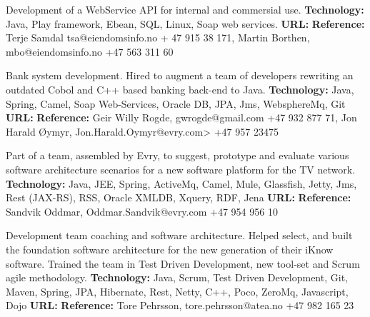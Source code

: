 \documentclass[11pt,a4paper,sans]{moderncv} %
\begin{document}
{
Development of a WebService API for internal and commersial use.
\newline{}\textbf{Technology:} Java, Play framework, Ebean, SQL, Linux, Soap web services.
\newline{}\textbf{URL:} 
\newline{}\textbf{Reference:} Terje Samdal tsa@eiendomsinfo.no + 47 915 38 171, Martin Borthen, mbo@eiendomsinfo.no +47 563 311 60
}

{
Bank system development. Hired to augment a team of developers rewriting an outdated Cobol and C++ based banking back-end to Java.
\newline{}\textbf{Technology:} Java, Spring, Camel, Soap Web-Services, Oracle DB, JPA, Jms, WebsphereMq, Git
\newline{}\textbf{URL:} 
\newline{}\textbf{Reference:} Geir Willy Rogde, gwrogde@gmail.com +47 932 877 71, Jon Harald Øymyr, Jon.Harald.Oymyr@evry.com> +47 957 23475
}

{
Part of a team, assembled by Evry, to suggest, prototype and evaluate various software architecture scenarios for a new software platform for	the TV network.
\newline{}\textbf{Technology:} Java, JEE, Spring, ActiveMq, Camel, Mule, Glassfish, Jetty, Jms, Rest (JAX-RS), RSS, Oracle XMLDB, Xquery, RDF, Jena
\newline{}\textbf{URL:} 
\newline{}\textbf{Reference:} Sandvik Oddmar, Oddmar.Sandvik@evry.com +47 954 956 10
}

{
Development team coaching and software architecture.
Helped select, and built the foundation  software architecture for the new generation of their iKnow software.
Trained the team in Test Driven Development, new tool-set and  Scrum agile methodology.
\newline{}\textbf{Technology:} Java,  Scrum,  Test Driven Development,  Git,  Maven,  Spring, JPA, Hibernate, Rest, Netty, C++, Poco, ZeroMq, Javascript, Dojo
\newline{}\textbf{URL:} 
\newline{}\textbf{Reference:} Tore Pehrsson,  tore.pehrsson@atea.no +47 982 165 23
}
\end{document}
